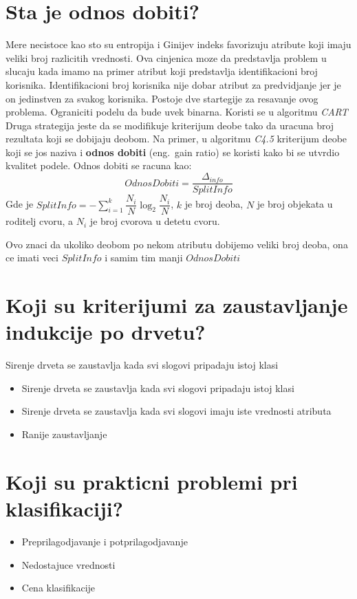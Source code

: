 \documentclass[a4paper]{article}
\begin{document}
\section{Sta je odnos dobiti?}
Mere necistoce kao sto su entropija i Ginijev indeks favorizuju atribute koji imaju veliki broj
razlicitih vrednosti. Ova cinjenica moze da predstavlja problem u slucaju kada imamo na primer
atribut koji predstavlja identifikacioni broj korisnika. Identifikacioni broj korisnika nije dobar
atribut za predvidjanje jer je on jedinstven za svakog korisnika. Postoje dve startegije za
resavanje ovog problema.  Ograniciti podelu da bude uvek binarna. Koristi se u algoritmu \emph{CART}
Druga strategija jeste da se modifikuje kriterijum deobe tako da uracuna broj rezultata koji se
dobijaju deobom. Na primer, u algoritmu \emph{C4.5} kriterijum deobe koji se jos naziva i
\textbf{odnos dobiti} (eng.\ gain ratio) se koristi kako bi se utvrdio kvalitet podele. Odnos dobiti
se racuna kao:
\begin{equation}
    \label{eq:odnos_dobiti}
    OdnosDobiti = \dfrac{\Delta_{info}}{SplitInfo}
\end{equation}
Gde je \(SplitInfo = -\sum_{i=1}^{k}\dfrac{N_i}{N}\log_2\dfrac{N_i}{N}\), \(k\) je broj deoba, \(N\)
je broj objekata u roditelj cvoru, a \(N_i\) je broj cvorova u detetu cvoru.

Ovo znaci da ukoliko deobom po nekom atributu dobijemo veliki broj deoba, ona ce imati veci
\(SplitInfo\) i samim tim manji \(OdnosDobiti\)

\section{Koji su kriterijumi za zaustavljanje indukcije po drvetu?}
Sirenje drveta se zaustavlja kada svi slogovi pripadaju istoj klasi
\begin{itemize}
    \item Sirenje drveta se zaustavlja kada svi slogovi pripadaju istoj klasi
    \item Sirenje drveta se zaustavlja kada svi slogovi imaju iste vrednosti atributa
    \item Ranije zaustavljanje
\end{itemize}

\section{Koji su prakticni problemi pri klasifikaciji?}
\begin{itemize}
    \item Preprilagodjavanje i potprilagodjavanje
    \item Nedostajuce vrednosti
    \item Cena klasifikacije
\end{itemize}
\end{document}
